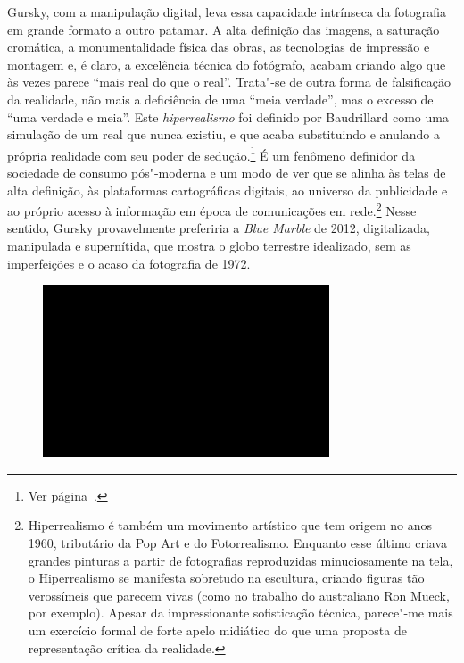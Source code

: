 Gursky, com a manipulação digital, leva essa capacidade intrínseca da
fotografia em grande formato a outro patamar. A alta definição das
imagens, a saturação cromática, a monumentalidade física das obras, as
tecnologias de impressão e montagem e, é claro, a excelência técnica do
fotógrafo, acabam criando algo que às vezes parece ``mais real do que o
real''. Trata"-se de outra forma de falsificação da realidade, não mais a deficiência de uma ``meia verdade'', mas o excesso de ``uma verdade e meia''. Este \emph{hiperrealismo} foi definido por Baudrillard como uma simulação de um real que nunca existiu, e que acaba substituindo e anulando a própria realidade com seu poder de sedução.\footnote{Ver página~\pageref{simulacros}.} É um fenômeno definidor da sociedade de consumo pós"-moderna e um modo
de ver que se alinha às
telas de alta definição, às plataformas cartográficas digitais, ao
universo da publicidade e ao próprio acesso à informação em época de
comunicações em rede.\footnote{Hiperrealismo é também um movimento artístico que tem origem no anos 1960, tributário da Pop Art e do Fotorrealismo. Enquanto esse último criava grandes pinturas a partir de fotografias reproduzidas minuciosamente na tela, o Hiperrealismo se manifesta sobretudo na escultura, criando figuras tão verossímeis que parecem vivas (como no trabalho do australiano Ron Mueck, por exemplo). Apesar da impressionante sofisticação técnica, parece"-me mais um exercício formal de forte apelo midiático do que uma proposta de representação crítica da realidade.} Nesse sentido, Gursky provavelmente preferiria a
\emph{Blue Marble} de 2012, digitalizada, manipulada e supernítida, que
mostra o globo terrestre idealizado, sem as imperfeições e o acaso da
fotografia de 1972.

\begin{figure}[!ht]

\centering
 \includegraphics[width=85mm]{./imgs/im1.jpg}
\caption{\tiny{}}

\end{figure}

